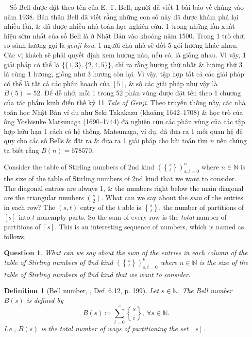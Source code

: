 \documentclass[oneside]{book}
\newtheorem{definition}{Definition}
\newtheorem{question}{Question}
\newcommand{\genstirlingII}[3]{%
	\genfrac{\{}{\}}{0pt}{#1}{#2}{#3}%
}
\newcommand{\stirlingII}[2]{\genstirlingII{}{#1}{#2}}
\begin{document}
-- Số Bell được đặt theo tên của {\sc E. T. Bell}, người đã viết 1 bài báo về chúng vào năm 1938. Bản thân {\sc Bell} đã viết rằng những con số này đã được khám phá lại nhiều lần, \& đã được nhiều nhà toán học nghiên cứu. 1 trong những lần xuất hiện sớm nhất của số Bell là ở Nhật Bản vào khoảng năm 1500. Trong 1 trò chơi so sánh hương gọi là {\it genji-kou}, 1 người chủ nhà sẽ đốt 5 gói hương khác nhau. Các vị khách sẽ phải quyết định xem hương nào, nếu có, là giống nhau. Vì vậy, 1 giải pháp có thể là $\{\{1,3\},\{2,4,5\}\}$, chỉ ra rằng hương thứ nhất \& hương thứ 3 là cùng 1 hương, giống như 3 hương còn lại. Vì vậy, tập hợp tất cả các giải pháp có thể là tất cả các phân hoạch của $[5]$, \& số các giải pháp như vậy là $B(5) = 52$. Để dễ nhớ, mỗi 1 trong 52 phân vùng được đặt tên theo 1 chương của tác phẩm kinh điển thế kỷ 11 {\it Tale of Genji}. Theo truyền thống này, các nhà toán học Nhật Bản ví dụ như {\sc Seki Takakazu} (khoảng 1642--1708) \& học trò của ông {\sc Yoshisuke Matsunaga} (1690--1744) đã nghiên cứu các phân vùng của các tập hợp hữu hạn 1 cách có hệ thống. {\sc Matsunaga}, ví dụ, đã đưa ra 1 mối quan hệ đệ quy cho các số Bells \& đặt ra \& đưa ra 1 giải pháp cho bài toán tìm $n$ nếu chúng ta biết rằng $B(n) = 678570$.

Consider the table of Stirling numbers of 2nd kind $\left(\stirlingII{s}{t}\right)_{s,t=0}^n$ where $n\in\mathbb{N}$ is the size of the table  of Stirling numbers of 2nd kind that we want to consider. The diagonal entries are always 1, \& the numbers right below the main diagonal are the triangular numbers $\binom{s}{2}$. What can we say about the {\it sum} of the entries in each row? The $(s,t)$ entry of the t able is $\stirlingII{s}{t}$, the number of partitions of $[s]$ into $t$ nonempty parts. So the sum of every row is the {\it total} number of partitions of $[s]$. This is an interesting sequence of numbers, which is named as follows.

\begin{question}
	What can we say about the {\it sum} of the entries in each column of the table of Stirling numbers of 2nd kind $\left(\stirlingII{s}{t}\right)_{s,t=0}^n$ where $n\in\mathbb{N}$ is the size of the table  of Stirling numbers of 2nd kind that we want to consider.
\end{question}

\begin{definition}[Bell number, \cite{Shahriari2022}, Def. 6.12, p. 199]
	Let $s\in\mathbb{N}$. The {\rm Bell number} $B(s)$ is defined by
	\begin{equation}
		\label{Bell number}
		B(s)\coloneqq\sum_{i=0}^s \stirlingII{s}{i},\ \forall s\in\mathbb{N}.
	\end{equation}
	I.e., $B(s)$ is the total number of ways of partitioning the set $[s]$.
\end{definition}
\end{document}
